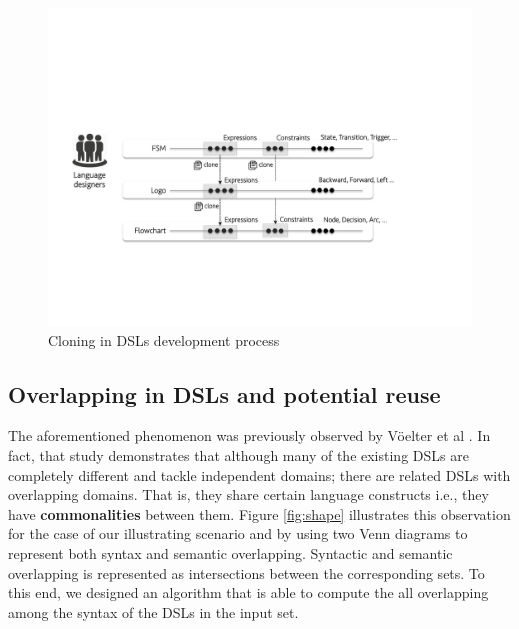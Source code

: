 \begin{figure}
\centering
\includegraphics[width=1\linewidth]{images/cloning.pdf}
\caption{Cloning in DSLs development process}
\label{fig:cloning}
\end{figure}


\subsection{Overlapping in DSLs and potential reuse}

The aforementioned phenomenon was previously observed by V\"oelter et al \cite[p. 60-61]{voelter:2013}. In fact, that study demonstrates that although many of the existing DSLs are completely different and tackle independent domains; there are related DSLs with overlapping domains. That is, they share certain language constructs i.e., they have \textbf{commonalities} between them. Figure \ref{fig:shape} illustrates this observation for the case of our illustrating scenario and by using two Venn diagrams to represent both syntax and semantic overlapping. Syntactic and semantic overlapping is represented as intersections between the corresponding sets. To this end, we designed an algorithm that is able to compute the all overlapping among the syntax of the DSLs in the input set. 

